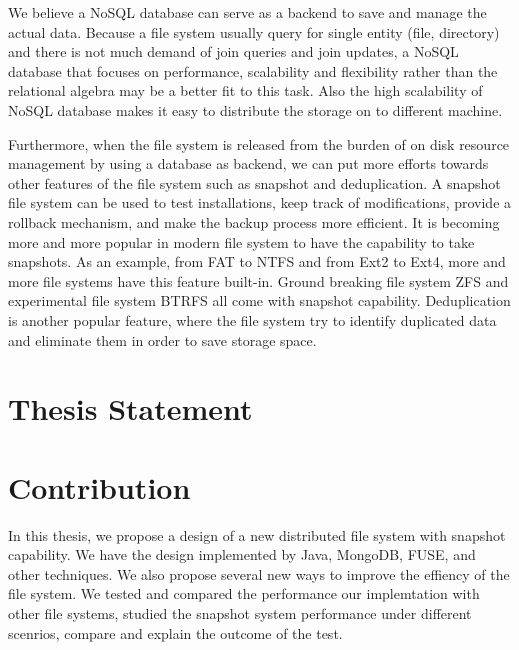     We believe a NoSQL database can serve as a backend to save and manage the actual data. Because a file system usually query for single entity (file, directory) and there is not much demand of join queries and join updates, a NoSQL database that focuses on performance, scalability and flexibility rather than the relational algebra may be a better fit to this task. Also the high scalability of NoSQL database makes it easy to distribute the storage on to different machine.

    Furthermore, when the file system is released from the burden of on disk resource management by using a database as backend, we can put more efforts towards other features of the file system such as snapshot and deduplication. A snapshot file system can be used to test installations, keep track of modifications, provide a rollback mechanism, and make the backup process more efficient. It is becoming more and more popular in modern file system to have the capability to take snapshots. As an example, from FAT to NTFS and from Ext2 to Ext4, more and more file systems have this feature built-in. Ground breaking file system ZFS and experimental file system BTRFS all come with snapshot capability. Deduplication is another popular feature, where the file system try to identify duplicated data and eliminate them in order to save storage space.

\section{Thesis Statement}


\section{Contribution}

    In this thesis, we propose a design of a new distributed file system with snapshot capability. We have the design implemented by Java, MongoDB, FUSE, and other techniques. We also propose several new ways to improve the effiency of the file system. We tested and compared the performance our implemtation with other file systems, studied the snapshot system performance under different scenrios, compare and explain the outcome of the test.
